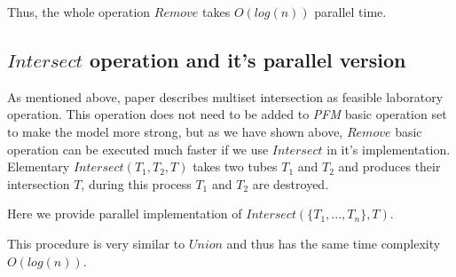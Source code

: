 Thus, the whole operation $Remove$ takes $O(log(n))$ parallel time.

\subsection{$Intersect$ operation and it's parallel version} \label{intersect}

As mentioned above, paper \cite{Dantsin:2003} describes multiset intersection as feasible laboratory operation. This operation does not need to be added to \emph{PFM} basic operation set to make the model more strong, but as we have shown above, $Remove$ basic operation can be executed much faster if we use $Intersect$ in it's implementation. Elementary $Intersect(T_1, T_2, T)$ takes two tubes $T_1$ and $T_2$ and produces their intersection $T$, during this process $T_1$ and $T_2$ are destroyed.

Here we provide parallel implementation of $Intersect(\{T_1, ..., T_n\}, T)$.


This procedure is very similar to $Union$ and thus has the same time complexity $O(log(n))$.